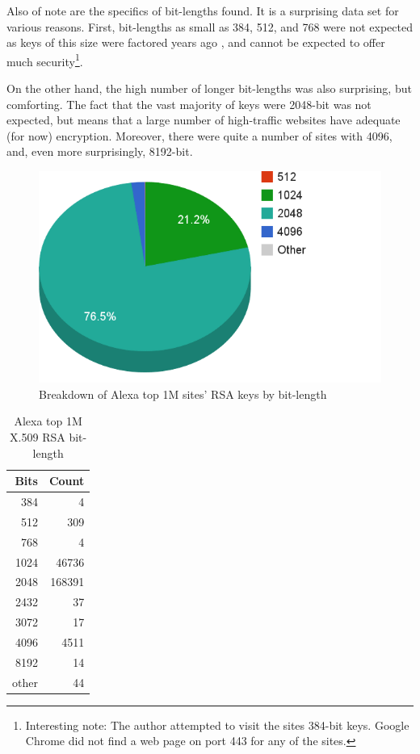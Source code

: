 \documentclass[12pt]{ucthesis}
\begin{document}
Also of note are the specifics of bit-lengths found. It is a surprising data
set for various reasons. First, bit-lengths as small as 384, 512, and 768 were
not expected as keys of this size were factored years ago
\cite{rsa2007challenge}, and cannot be expected to offer much
security\footnote{Interesting note: The author attempted to visit the sites
384-bit keys. Google Chrome did not find a web page on port 443 for any of
the sites.}.

On the other hand, the high number of longer bit-lengths was also surprising,
but comforting. The fact that the vast majority of keys were 2048-bit was not
expected, but means that a large number of high-traffic websites have adequate
(for now) encryption. Moreover, there were quite a number of sites with 4096,
and, even more surprisingly, 8192-bit.

\begin{figure}
   \label{fig:bits}
   \centering
   \includegraphics[width=0.75\linewidth]{bit_length.png}
   \caption{Breakdown of Alexa top 1M sites' RSA keys by bit-length}
\end{figure}

\begin{table}
\label{tab:bits}
\centering
\caption{Alexa top 1M X.509 RSA bit-length}
\begin{tabular}{|r|r|}\hline
\textbf{Bits} & \textbf{Count}\\\hline
384 & 4 \\ \hline
512 & 309 \\ \hline
768 & 4 \\ \hline
1024 & 46736 \\ \hline
2048 & 168391 \\ \hline
2432 & 37 \\ \hline
3072 & 17 \\ \hline
4096 & 4511 \\ \hline
8192 & 14 \\ \hline
other & 44 \\ \hline
\end{tabular}
\end{table}
\end{document}
